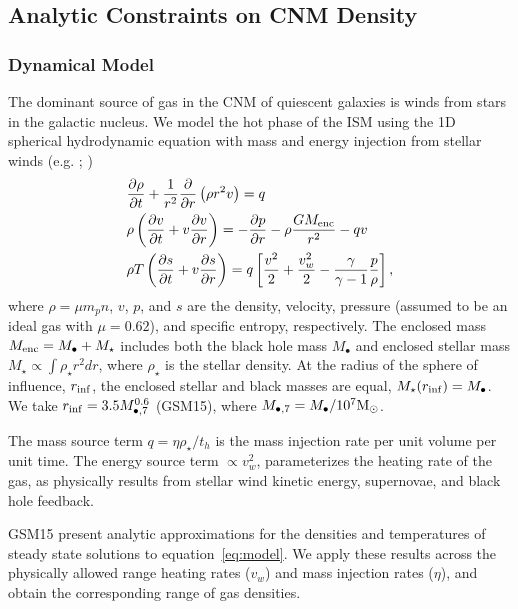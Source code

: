 \documentclass[usenatbib,fleqn]{mnras}
\newcommand{\Mbh}[1][]{M_{\bullet#1}}
\newcommand{\Menc}{M_{\rm enc}}
\renewcommand{\th}{t_h}
\newcommand{\Msun}{{\rm M_\odot}}
\begin{document}
\subsection{Analytic Constraints on CNM Density}
\label{sec:analy}

\subsubsection{Dynamical Model}
\label{sec:model}

The dominant source of gas in the CNM of quiescent galaxies is winds
from stars in the galactic nucleus. We model the hot phase of the ISM
using the 1D spherical hydrodynamic equation with mass and energy
injection from stellar winds (e.g. \citealt{Holzer+1970};
\citealt{Quataert2004})
\begin{align}
  &\frac{\partial \rho}{\partial t}+\frac{1}{r^2}\frac{\partial}{\partial r}\left(\rho r^2 v\right)=q \label{eq:drhodt}\\
  &\rho \left(\frac{\partial v}{\partial t} + v\frac{\partial
      v}{\partial r}\right) =-\frac{\partial p}{\partial r}- \rho\frac{GM_{\rm enc}}{r^{2}} -q v \label{eq:dvdt}\\
  &\rho T\left(\frac{\partial s}{\partial t} + v\frac{\partial
      s}{\partial
      r}\right)=q\left[\frac{v^2}{2}+\frac{v_w^2}{2}-\frac{\gamma}{\gamma-1}
    \frac{p}{\rho} \right] ,
\label{eq:model}
\end{align}
where $\rho = \mu m_p n$, $v$, $p$, and $s$ are the density, velocity,
pressure (assumed to be an ideal gas with $\mu = 0.62$), and specific
entropy, respectively.  The enclosed mass $\Menc = M_{\bullet} +
M_{\star}$ includes both the black hole mass $M_{\bullet}$ and
enclosed stellar mass $M_{\star} \propto \int \rho_{\star}r^{2}dr$, where $\rho_{\star}$ is the stellar density. At
the radius of the sphere of influence, $r_{\rm inf}$, the enclosed stellar and black masses are equal, $M_{\star}(r_{\rm inf})=\Mbh$.  We take $r_{\rm inf}=3.5 \Mbh[,7]^{0.6}$ (GSM15), where $\Mbh[,7]=\Mbh/10^7
\Msun$.

The mass source term $q =\eta \rho_\star/\th$ is the mass injection
rate per unit volume per unit time. The energy source term $\propto v_w^{2}$, parameterizes the
heating rate of the gas, as physically results from stellar wind
kinetic energy, supernovae, and black hole feedback.

GSM15 present analytic approximations for the
densities and temperatures of steady state solutions to
equation~\eqref{eq:model}. We apply these results across the
physically allowed range heating rates ($v_w$) and mass injection
rates ($\eta$), and obtain the corresponding range of gas densities.
\end{document}
